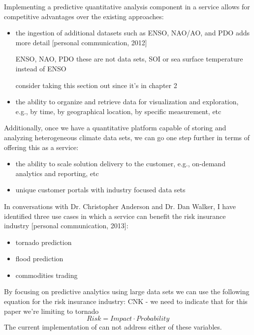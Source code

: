 Implementing a predictive quantitative analysis component in a \ce service allows for competitive advantages over the existing approaches:
\begin{itemize}
    \item{the ingestion of additional datasets such as \textsc{ENSO}, \textsc{NAO/AO}, and \textsc{PDO} adds more detail [personal communication, 2012]}
    
   ENSO, NAO, PDO  these are not data sets, 
        SOI or sea surface temperature instead of ENSO
        
        consider taking this section out since it's in chapter 2
        
    
    \item the ability to organize and retrieve data for visualization and exploration, e.g., by time, by geographical location, by specific measurement, etc
\end{itemize}
Additionally, once we have a quantitative platform capable of storing and analyzing heterogeneous climate data sets, we can go one step further in terms of offering this as a service:
\begin{itemize}
    \item{the ability to scale solution delivery to the customer, e.g., on-demand analytics and reporting, etc}
    \item{unique customer portals with industry focused data sets}
\end{itemize}
In conversations with Dr. Christopher Anderson and Dr. Dan Walker, I have identified three use cases in which a \ce service can benefit the risk insurance industry [personal communication, 2013]:
\begin{itemize}
    \item tornado prediction
    \item flood prediction
    \item commodities trading
\end{itemize}
By focusing on predictive analytics using large data sets we can use the following equation for the risk insurance industry: CNK - we need to indicate that for this paper we're limiting to tornado
\begin{equation*}
    Risk = Impact \cdot Probability
\end{equation*}
The current implementation of \climatedge can not address either of these variables.

%
%

